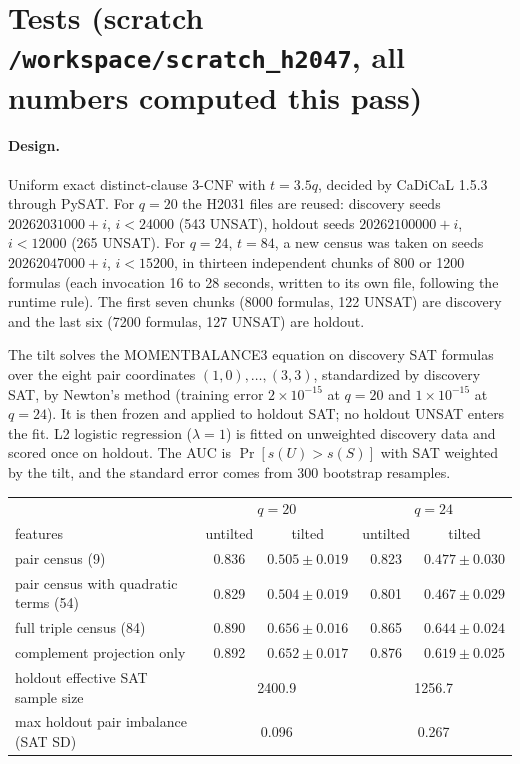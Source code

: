 \documentclass[11pt]{article}
\begin{document}
\section*{Tests (scratch \texttt{/workspace/scratch\_h2047}, all numbers computed this pass)}
\paragraph{Design.} Uniform exact distinct-clause 3-CNF with $t=3.5q$, decided by CaDiCaL 1.5.3 through PySAT. For $q=20$ the H2031 files are reused: discovery seeds $20262031000+i$, $i<24000$ (543 UNSAT), holdout seeds $20262100000+i$, $i<12000$ (265 UNSAT). For $q=24$, $t=84$, a new census was taken on seeds $20262047000+i$, $i<15200$, in thirteen independent chunks of 800 or 1200 formulas (each invocation 16 to 28 seconds, written to its own file, following the runtime rule). The first seven chunks (8000 formulas, 122 UNSAT) are discovery and the last six (7200 formulas, 127 UNSAT) are holdout.

The tilt solves the MOMENTBALANCE3 equation on discovery SAT formulas over the eight pair coordinates $(1,0),\dots,(3,3)$, standardized by discovery SAT, by Newton's method (training error $2\times10^{-15}$ at $q=20$ and $1\times10^{-15}$ at $q=24$). It is then frozen and applied to holdout SAT; no holdout UNSAT enters the fit. L2 logistic regression ($\lambda=1$) is fitted on unweighted discovery data and scored once on holdout. The AUC is $\Pr[s(U)>s(S)]$ with SAT weighted by the tilt, and the standard error comes from 300 bootstrap resamples.

\begin{center}\begin{tabular}{lcccc}\toprule
 & \multicolumn{2}{c}{$q=20$} & \multicolumn{2}{c}{$q=24$}\\
features & untilted & tilted & untilted & tilted\\\midrule
pair census (9) & 0.836 & $0.505\pm0.019$ & 0.823 & $0.477\pm0.030$\\
pair census with quadratic terms (54) & 0.829 & $0.504\pm0.019$ & 0.801 & $0.467\pm0.029$\\
full triple census (84) & 0.890 & $0.656\pm0.016$ & 0.865 & $0.644\pm0.024$\\
complement projection only & 0.892 & $0.652\pm0.017$ & 0.876 & $0.619\pm0.025$\\\midrule
holdout effective SAT sample size & \multicolumn{2}{c}{2400.9} & \multicolumn{2}{c}{1256.7}\\
max holdout pair imbalance (SAT SD) & \multicolumn{2}{c}{0.096} & \multicolumn{2}{c}{0.267}\\\bottomrule
\end{tabular}\end{center}
\end{document}
